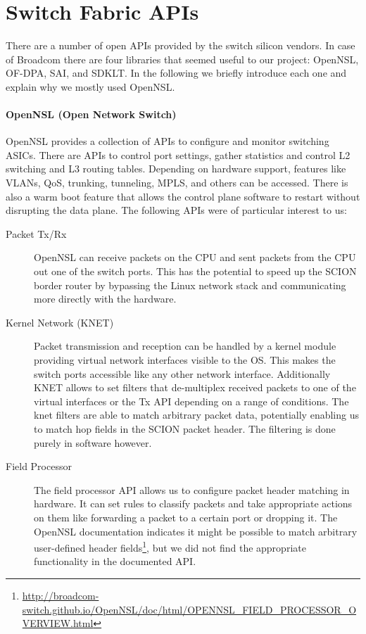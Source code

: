 \documentclass[a4paper]{article}
\begin{document}
\section{Switch Fabric APIs}
There are a number of open APIs provided by the switch silicon vendors. In case of Broadcom there are four libraries that seemed useful to our project: OpenNSL, OF-DPA, SAI, and SDKLT. In the following we briefly introduce each one and explain why we mostly used OpenNSL.

\paragraph{OpenNSL (Open Network Switch)}
OpenNSL provides a collection of APIs to configure and monitor switching ASICs. There are APIs to control port settings, gather statistics and control L2 switching and L3 routing tables. Depending on hardware support, features like VLANs, QoS, trunking, tunneling, MPLS, and others can be accessed. There is also a warm boot feature that allows the control plane software to restart without disrupting the data plane. The following APIs were of particular interest to us:
\begin{description}
\item [Packet Tx/Rx] OpenNSL can receive packets on the CPU and sent packets from the CPU out one of the switch ports. This has the potential to speed up the SCION border router by bypassing the Linux network stack and communicating more directly with the hardware.
\item [Kernel Network (KNET)] Packet transmission and reception can be handled by a kernel module providing virtual network interfaces visible to the OS. This makes the switch ports accessible like any other network interface. Additionally KNET allows to set filters that de-multiplex received packets to one of the virtual interfaces or the Tx API depending on a range of conditions. The knet filters are able to match arbitrary packet data, potentially enabling us to match hop fields in the SCION packet header. The filtering is done purely in software however.
\item [Field Processor] The field processor API allows us to configure packet header matching in hardware. It can set rules to classify packets and take appropriate actions on them like forwarding a packet to a certain port or dropping it. The OpenNSL documentation indicates it might be possible to match arbitrary user-defined header fields\footnote{\url{http://broadcom-switch.github.io/OpenNSL/doc/html/OPENNSL_FIELD_PROCESSOR_OVERVIEW.html}}, but we did not find the appropriate functionality in the documented API.
\end{description}
\end{document}
